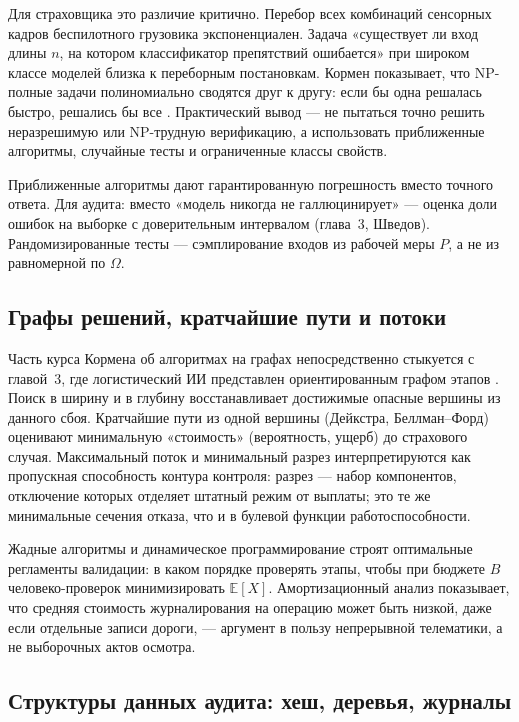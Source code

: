 \documentclass[a4paper,14pt]{extarticle}
\begin{document}
Для страховщика это различие критично. Перебор всех комбинаций сенсорных кадров беспилотного грузовика экспоненциален. Задача «существует ли вход длины $n$, на котором классификатор препятствий ошибается» при широком классе моделей близка к переборным постановкам. Кормен показывает, что NP-полные задачи полиномиально сводятся друг к другу: если бы одна решалась быстро, решались бы все \cite{cormen}. Практический вывод --- не пытаться точно решить неразрешимую или NP-трудную верификацию, а использовать приближенные алгоритмы, случайные тесты и ограниченные классы свойств.

Приближенные алгоритмы \cite{cormen} дают гарантированную погрешность вместо точного ответа. Для аудита: вместо «модель никогда не галлюцинирует» --- оценка доли ошибок на выборке с доверительным интервалом (глава~3, Шведов). Рандомизированные тесты --- сэмплирование входов из рабочей меры $P$, а не из равномерной по $\Omega$.

\subsection{Графы решений, кратчайшие пути и потоки}

Часть курса Кормена об алгоритмах на графах непосредственно стыкуется с главой~3, где логистический ИИ представлен ориентированным графом этапов \cite{cormen, yablonsky}. Поиск в ширину и в глубину восстанавливает достижимые опасные вершины из данного сбоя. Кратчайшие пути из одной вершины (Дейкстра, Беллман--Форд) оценивают минимальную «стоимость» (вероятность, ущерб) до страхового случая. Максимальный поток и минимальный разрез \cite{cormen} интерпретируются как пропускная способность контура контроля: разрез --- набор компонентов, отключение которых отделяет штатный режим от выплаты; это те же минимальные сечения отказа, что и в булевой функции работоспособности.

Жадные алгоритмы и динамическое программирование \cite{cormen} строят оптимальные регламенты валидации: в каком порядке проверять этапы, чтобы при бюджете $B$ человеко-проверок минимизировать $\mathbb{E}[X]$. Амортизационный анализ показывает, что средняя стоимость журналирования на операцию может быть низкой, даже если отдельные записи дороги, --- аргумент в пользу непрерывной телематики, а не выборочных актов осмотра.

\subsection{Структуры данных аудита: хеш, деревья, журналы}
\end{document}
